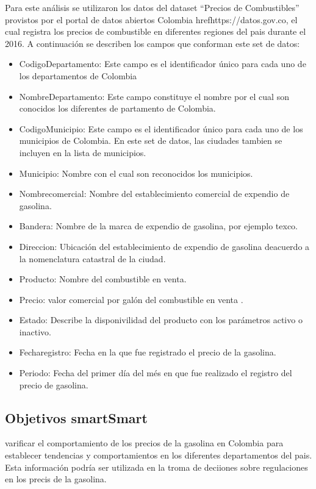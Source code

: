 Para este análisis se utilizaron los datos  del dataset “Precios de Combustibles” provistos por el portal de datos abiertos Colombia href{https://datos.gov.co}, el cual registra los precios de combustible en diferentes regiones del pais durante el 2016. A continuación se describen los campos que conforman este set de datos: 
 \begin{itemize}
  \item{CodigoDepartamento:} Este campo es el identificador único para cada uno de los departamentos de Colombia
  \item{NombreDepartamento:} Este campo constituye el nombre por el cual son conocidos los diferentes de partamento de Colombia. 
  \item{CodigoMunicipio:} Este campo es el identificador único para cada uno de los municipios de Colombia. En este set de datos, las ciudades tambien se incluyen en la lista de municipios. 
  \item{Municipio:} Nombre con el cual son reconocidos los municipios.	
  \item{Nombrecomercial:} Nombre del establecimiento comercial de expendio de gasolina. 
  \item{Bandera: } Nombre de la marca de expendio de gasolina, por ejemplo texco. 
  \item{Direccion:} Ubicación del establecimiento  de expendio de gasolina deacuerdo a la nomenclatura catastral de la ciudad. 
  \item{Producto:} Nombre del combustible en venta.
  \item{Precio:} valor comercial por galón del combustible en venta	.
  \item{Estado:} Describe la disponivilidad del producto con los parámetros activo o inactivo.
  \item{Fecharegistro:} Fecha en la que fue registrado el precio de la gasolina.
  \item{Periodo:} Fecha del primer día del més en que fue realizado el registro del precio de gasolina.
 \end{itemize}
 \subsection{Objetivos smartSmart}
 varificar el comportamiento de los precios de la gasolina en Colombia para establecer tendencias y comportamientos en los diferentes departamentos del pais.\\ Esta información podría ser utilizada en la troma de deciiones sobre regulaciones en los precis de la gasolina.
